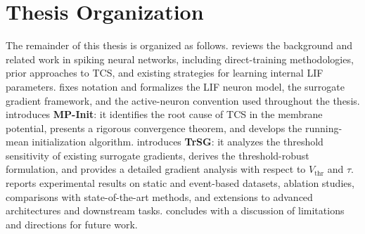 \section{Thesis Organization}
\label{sec:intro_organization}

The remainder of this thesis is organized as follows.
 reviews the background and related work in spiking neural networks, including direct-training methodologies, prior approaches to TCS, and existing strategies for learning internal LIF parameters.
 fixes notation and formalizes the LIF neuron model, the surrogate gradient framework, and the active-neuron convention used throughout the thesis.
 introduces \textbf{MP-Init}: it identifies the root cause of TCS in the membrane potential, presents a rigorous convergence theorem, and develops the running-mean initialization algorithm.
 introduces \textbf{TrSG}: it analyzes the threshold sensitivity of existing surrogate gradients, derives the threshold-robust formulation, and provides a detailed gradient analysis with respect to $V_{\text{thr}}$ and $\tau$.
 reports experimental results on static and event-based datasets, ablation studies, comparisons with state-of-the-art methods, and extensions to advanced architectures and downstream tasks.
 concludes with a discussion of limitations and directions for future work.

